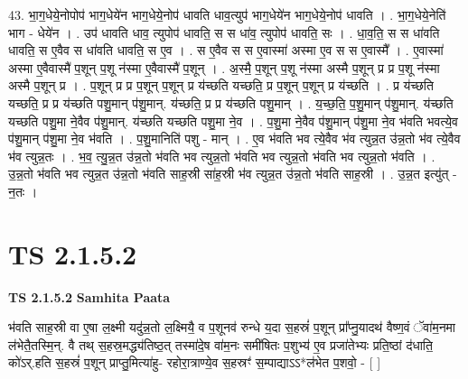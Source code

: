 \documentclass[17pt]{extarticle}
\begin{document}
43. भा॒ग॒धेये॒नोपोप॑ भाग॒धेये॑न भाग॒धेये॒नोप॑ धावति धाव॒त्युप॑ भाग॒धेये॑न भाग॒धेये॒नोप॑ धावति । . भा॒ग॒धेये॒नेति॑ भाग - धेये॑न । . उप॑ धावति धाव॒ त्युपोप॑ धावति॒ स स धा॑व॒ त्युपोप॑ धावति॒ सः । . धा॒व॒ति॒ स स धा॑वति धावति॒ स ए॒वैव स धा॑वति धावति॒ स ए॒व । . स ए॒वैव स स ए॒वास्मा॑ अस्मा ए॒व स स ए॒वास्मै᳚ । . ए॒वास्मा॑ अस्मा ए॒वैवास्मै॑ प॒शून् प॒शू न॑स्मा ए॒वैवास्मै॑ प॒शून् । . अ॒स्मै॒ प॒शून् प॒शू न॑स्मा अस्मै प॒शून् प्र प्र प॒शू न॑स्मा अस्मै प॒शून् प्र । . प॒शून् प्र प्र प॒शून् प॒शून् प्र य॑च्छति यच्छति॒ प्र प॒शून् प॒शून् प्र य॑च्छति । . प्र य॑च्छति यच्छति॒ प्र प्र य॑च्छति पशु॒मान् प॑शु॒मान्. य॑च्छति॒ प्र प्र य॑च्छति पशु॒मान् । . य॒च्छ॒ति॒ प॒शु॒मान् प॑शु॒मान्. य॑च्छति यच्छति पशु॒मा ने॒वैव प॑शु॒मान्. य॑च्छति यच्छति पशु॒मा ने॒व । . प॒शु॒मा ने॒वैव प॑शु॒मान् प॑शु॒मा ने॒व भ॑वति भवत्ये॒व प॑शु॒मान् प॑शु॒मा ने॒व भ॑वति । . प॒शु॒मानिति॑ पशु - मान् । . ए॒व भ॑वति भव त्ये॒वैव भ॑व त्युन्न॒त उ॑न्न॒तो भ॑व त्ये॒वैव भ॑व त्युन्न॒तः । . भ॒व॒ त्यु॒न्न॒त उ॑न्न॒तो भ॑वति भव त्युन्न॒तो भ॑वति भव त्युन्न॒तो भ॑वति भव त्युन्न॒तो भ॑वति । . उ॒न्न॒तो भ॑वति भव त्युन्न॒त उ॑न्न॒तो भ॑वति साह॒स्री सा॑ह॒स्री भ॑व त्युन्न॒त उ॑न्न॒तो भ॑वति साह॒स्री । . उ॒न्न॒त इत्यु॑त् - न॒तः । \newline
\pagebreak
{}
\section*{ TS 2.1.5.2 }

\textbf{TS 2.1.5.2 } \newline
\textbf{Samhita Paata} \newline

भ॑वति साह॒स्री वा ए॒षा ल॒क्ष्मी यदु॑न्न॒तो ल॒क्ष्मियै॒ व प॒शूनव॑ रुन्धे य॒दा स॒हस्रं॑ प॒शून् प्रा᳚प्नु॒यादथ॑ वैष्ण॒वं ॅवा॑म॒नमा ल॑भेतै॒तस्मि॒न्. वै तथ् स॒हस्र॒मद्ध्य॑तिष्ठ॒त् तस्मा॑दे॒ष वा॑म॒नः समी॑षितः प॒शुभ्य॑ ए॒व प्रजा॑तेभ्यः प्रति॒ष्ठां द॑धाति॒ को॑ऽर्.हति स॒हस्रं॑ प॒शून् प्राप्तु॒मित्या॑हु- रहोरा॒त्राण्ये॒व स॒हस्रꣳ॑ स॒म्पाद्याऽऽ*ल॑भेत प॒शवो॒ - [  ] \newline
\end{document}
